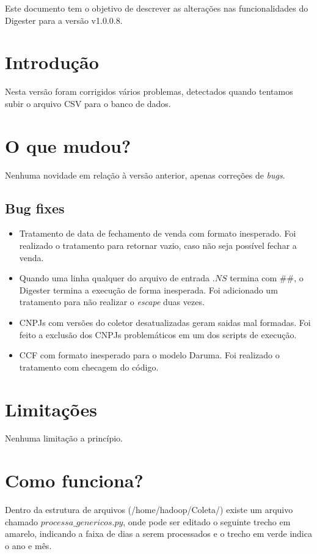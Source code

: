 \documentclass{article}      %
\newcommand{\versiondigester}{v1.0.0.8}
\begin{document}
Este documento tem o objetivo de descrever as alterações nas funcionalidades do Digester para a versão \versiondigester. 


\section{Introdução}     
Nesta versão foram corrigidos vários problemas, detectados quando tentamos subir o arquivo CSV para o banco de dados. 

\section{O que mudou?}

Nenhuma novidade em relação à versão anterior, apenas correções de \emph{bugs}.

\subsection{Bug fixes}
\begin{itemize}
    \item Tratamento de data de fechamento de venda com formato inesperado. Foi realizado o tratamento para retornar vazio, caso não seja possível fechar a venda.  
    \item Quando uma linha qualquer do arquivo de entrada $.NS$ termina com $\#\#$, o Digester termina a execução de forma inesperada. Foi adicionado um tratamento para não realizar o \emph{escape} duas vezes.
    \item CNPJs com versões do coletor desatualizadas geram saidas mal formadas. Foi feito a exclusão dos CNPJs problemáticos em um dos scripts de execução.
    \item CCF com formato inesperado para o modelo Daruma. Foi realizado o tratamento com checagem do código.
\end{itemize}


\section{Limitações}
Nenhuma limitação a princípio.

\section{Como funciona?}

Dentro da estrutura de arquivos (/home/hadoop/Coleta/) existe um arquivo chamado $processa\_genericos.py$, onde pode ser editado o seguinte trecho em amarelo, indicando a faixa de dias a serem processados e o trecho em verde indica o ano e mês.
\end{document}
